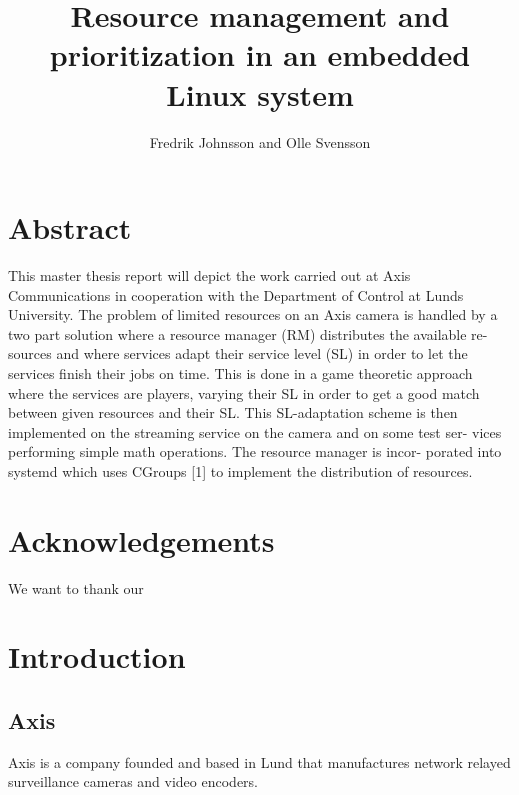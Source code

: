 \documentclass[nobiblatex]{LTHthesis}
\begin{document}
\begin{titlepages}
\author{Fredrik Johnsson and Olle Svensson}
\title{Resource management and prioritization in an embedded Linux system}

\end{titlepages}
\setcounter{page}{1}

\chapter*{Abstract}
This master thesis report will depict the work carried out at Axis Communications in cooperation with the Department of Control at Lunds University. The problem of limited resources on an Axis camera is handled by a two
part solution where a resource manager (RM) distributes the available re-
sources and where services adapt their service level (SL) in order to let the
services finish their jobs on time. This is done in a game theoretic approach
where the services are players, varying their SL in order to get a good match
between given resources and their SL. This SL-adaptation scheme is then
implemented on the streaming service on the camera and on some test ser-
vices performing simple math operations. The resource manager is incor-
porated into systemd which uses CGroups [1] to implement the distribution
of resources.


\chapter*{Acknowledgements}
We want to thank our 

\newpage
\tableofcontents
\newpage

\setcounter{page}{1}

\chapter{Introduction} %
\section{Axis}
Axis is a company founded and based in Lund that manufactures network relayed surveillance cameras and video encoders.
\end{document}
